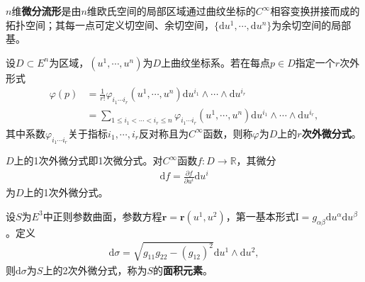 \documentclass[../../main.tex]{subfiles}%
\begin{document}
\begin{definition}
$n$维\textbf{微分流形}是由$n$维欧氏空间的局部区域通过曲纹坐标的$C^\infty$相容变换拼接而成的拓扑空间；其每一点可定义切空间、余切空间，$\{\mathrm{d}u^1,\cdots,\mathrm{d}u^n\}$为余切空间的局部基。
\end{definition}

\begin{definition}
设$D\subset E^n$为区域，$(u^1,\cdots,u^n)$为$D$上曲纹坐标系。若在每点$p\in D$指定一个$r$次外形式
\begin{align}
\varphi(p)&=\frac{1}{r!}\varphi_{i_1\cdots i_r}(u^1,\cdots,u^n)\mathrm{d}u^{i_1}\wedge\cdots\wedge\mathrm{d}u^{i_r}\nonumber\\
&=\sum\limits_{1\leqslant i_1<\cdots<i_r\leqslant n}\varphi_{i_1\cdots i_r}(u^1,\cdots,u^n)\mathrm{d}u^{i_1}\wedge\cdots\wedge\mathrm{d}u^{i_r},
\label{eq:r_differential_form}
\end{align}
其中系数$\varphi_{i_1\cdots i_r}$关于指标$i_1,\cdots,i_r$反对称且为$C^\infty$函数，则称$\varphi$为$D$上的\textbf{$r$次外微分式}。
\end{definition}

\begin{example}
$D$上的1次外微分式即1次微分式。对$C^\infty$函数$f:D\to\mathbb{R}$，其微分
\begin{align*}
\mathrm{d}f=\frac{\partial f}{\partial u^i}\mathrm{d}u^i
\end{align*}
为$D$上的1次外微分式。
\end{example}

\begin{example}
设$S$为$E^3$中正则参数曲面，参数方程$\boldsymbol{r}=\boldsymbol{r}(u^1,u^2)$，第一基本形式$\mathrm{I}=g_{\alpha\beta}\mathrm{d}u^\alpha\mathrm{d}u^\beta$。定义
\begin{align}
\mathrm{d}\sigma=\sqrt{g_{11}g_{22}-(g_{12})^2}\mathrm{d}u^1\wedge\mathrm{d}u^2,
\label{eq:area_element}
\end{align}
则$\mathrm{d}\sigma$为$S$上的2次外微分式，称为$S$的\textbf{面积元素}。
\end{example}
\end{document}
